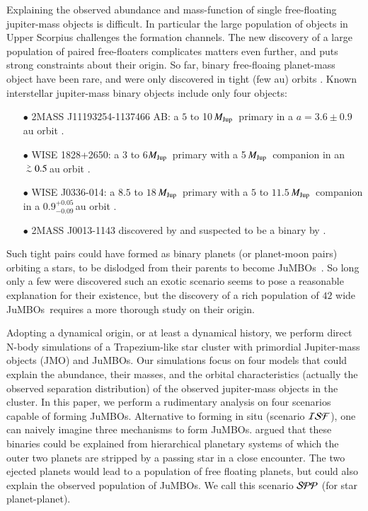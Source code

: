 \documentclass[submission,phys]{lib/SciPost}
\newcommand{\MJup}{\mbox{${M}_{\rm Jup}$}}
\def\apgt{\ {\raise-.5ex\hbox{$\buildrel>\over\sim$}}\ }
\newcommand{\jumbos}{\mbox{JuMBOs}}
\begin{document}
Explaining the observed abundance and mass-function of single
free-floating jupiter-mass objects is difficult.  In particular the
large population of objects in Upper Scorpius challenges the formation
channels. The new discovery of a large population of paired
free-floaters complicates matters even further, and puts strong
constraints about their origin. So far, binary free-floaing
planet-mass object have been rare, and were only discovered in tight
(few au) orbits \cite{2021ApJS..253....7K}.  Known interstellar
jupiter-mass binary objects include only four objects:
\begin{itemize}
\item[$\bullet$]2MASS J11193254-1137466 AB: a $5$ to 10\,\MJup\,
  primary in a $a=3.6\pm0.9$\,au orbit \cite{2017ApJ...843L...4B}.
\item[$\bullet$]WISE 1828+2650: a 3 to 6\MJup\, primary with a
  5\,\MJup\ companion in an $\apgt 0.5$\,au orbit
  \cite{2013ApJ...764..101B}.
\item[$\bullet$] WISE J0336-014: a $8.5$ to
  $18$\,\MJup\ primary with a $5$ to $11.5$\,\MJup\, companion in a
  $0.9^{+0.05}_{-0.09}$\,au orbit \cite{2023ApJ...947L..30C}.
\item[$\bullet$]2MASS J0013-1143 discovered by \cite{2017AJ....154..112K} and
  suspected to be a binary by \cite{2019A&A...629A.145E}.
\end{itemize}

Such tight pairs could have formed as binary planets (or planet-moon
pairs) orbiting a stars, to be dislodged from their parents to become
\jumbos\, \cite{2016ApJ...819..125C}.  So long only a few were
discovered such an exotic scenario seems to pose a reasonable
explanation for their existence, but the discovery of a rich
population of $42$ wide \jumbos\, \cite{2023arXiv231001231P} requires
a more thorough study on their origin.

Adopting a dynamical origin, or at least a dynamical history, we
perform direct N-body simulations of a Trapezium-like star cluster
with primordial Jupiter-mass objects (JMO) and \jumbos. Our
simulations focus on four models that could explain the abundance,
their masses, and the orbital characteristics (actually the observed
separation distribution) of the observed jupiter-mass objects in the
cluster. In this paper, we perform a rudimentary analysis on four
scenarios capable of forming \jumbos.  Alternative to forming in situ
(scenario ${\cal ISF}$), one can naively imagine three mechanisms to
form \jumbos. \cite{2023arXiv231006016W} argued that these binaries
could be explained from hierarchical planetary systems of which the
outer two planets are stripped by a passing star in a close
encounter. The two ejected planets would lead to a population of free
floating planets, but could also explain the observed population of
\jumbos.  We call this scenario ${\cal SPP}$ (for star planet-planet).
\end{document}
